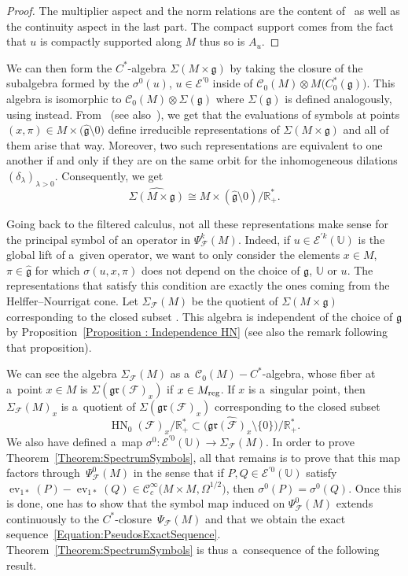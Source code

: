 \documentclass[pdftex]{sigma}
\newcommand{\R}{\mathbb R} %
\newcommand{\CCC}{\mathscr{C}} %
\newcommand{\F}{\mathcal{F}} %
\newcommand{\g}{\mathfrak{g}} %
\newcommand{\ev}{\operatorname{ev}} %
\newcommand{\HN}{\operatorname{HN}} %
\newcommand{\Fb}{\mathcal{F}} %
\newcommand{\gr}{\mathfrak{gr}} %
\newcommand{\U}{\mathbb U} %
\numberwithin{equation}{section}
\theoremstyle{definition}
\begin{document}
\begin{proof}
The multiplier aspect and the norm relations are the content of~\cite[Theorem~3.18]{AMYMaximalHypoellipticity} as well as the continuity aspect in the last part. The compact support comes from the fact that $u$ is compactly supported along $M$ thus so is $A_u$.
\end{proof}

We can then form the $C^*$-algebra $\Sigma(M\times \g)$ by taking the closure of the subalgebra formed by the $\sigma^0(u)$, $u\in \mathcal{E}^{'0}$ inside of $\CCC_0(M)\otimes M\bigl(C^*_0(\g)\bigr)$. This algebra is isomorphic to $\CCC_0(M) \otimes \Sigma(\g)$ where $\Sigma(\g)$ is defined analogously, using \smash{$\mathcal{E}^{'0}(\g)$} instead. From~\cite[Proposition 5.6]{FermanianFischerGradedLie} (see also~\cite[Theorem 5.8]{CrenFilteredCrossedProduct}), we get that the evaluations of symbols at points $(x,\pi)\in M \times \bigl(\widehat{\g}\setminus 0\bigr)$ define irreducible representations of $\Sigma(M\times \g)$ and all of them arise that way. Moreover, two such representations are equivalent to one another if and only if they are on the same orbit for the inhomogeneous dilations $(\delta_{\lambda})_{\lambda >0}$. Consequently, we get
\[\widehat{\Sigma(M\times \g)} \cong M \times {(\widehat{\g}\setminus 0)}/{\R^*_+}.\]

Going back to the filtered calculus, not all these representations make sense for the principal symbol of an operator in $\Psi^k_{\Fb}(M)$. Indeed, if $u\in \mathcal{E}^{'k}(\U)$ is the global lift of a~given operator, we want to only consider the elements $x\in M$, $\pi \in \widehat{\g}$ for which $\sigma(u,x,\pi)$ does not depend on the choice of $\g$, $\U$ or $u$. The representations that satisfy this condition are exactly the ones coming from the Helffer--Nourrigat cone. Let $\Sigma_{\Fb}(M)$ be the quotient of $\Sigma(M\times \g)$ corresponding to the closed subset \smash{${\HN_0(\Fb)}/{\R^*_+}$}. This algebra is independent of the choice of $\g$ by Proposition~\ref{Proposition : Independence HN} (see also the remark following that proposition).

We can see the algebra $\Sigma_{\F}(M)$ as a~$\CCC_0(M)-C^*$-algebra, whose fiber at a~point $x \in M$ is $\Sigma(\gr(\Fb)_x)$ if $x \in M_{\rm reg}$. If $x$ is a~singular point, then $\Sigma_{\F}(M)_{x}$ is a~quotient of $\Sigma(\gr(\Fb)_x)$ corresponding to the closed subset
\[
{\HN_0(\Fb)_x}/{\R^*_+} \subset  {\bigl(\widehat{\gr(\Fb)_x}\setminus \{0\}\bigr)}/{\R^*_+}.
\]
 We also have defined a~map $\sigma^0 \colon \mathcal{E}^{'0}(\mathcal{\mathbb{U}}) \to \Sigma_{\F}(M)$.
In order to prove Theorem~\ref{Theorem:SpectrumSymbols}, all that remains is to prove that this map factors through~$\Psi^0_{\F}(M)$ in the sense that if $P,Q \in \mathcal{E}^{'0}(\mathbb{U})$ satisfy $\ev_{1*}(P) - \ev_{1*}(Q)\in \CCC^{\infty}_c\bigl(M\times M,\Omega^{1/2}\bigr)$, then $\sigma^0(P)=\sigma^0(Q)$. Once this is done, one has to show that the symbol map induced on $\Psi^0_{\F}(M)$ extends continuously to the $C^*$-closure~$\Psi_{\F}(M)$ and that we obtain the exact sequence~\eqref{Equation:PseudosExactSequence}. Theorem~\ref{Theorem:SpectrumSymbols} is thus a~consequence of the following result.
\end{document}
